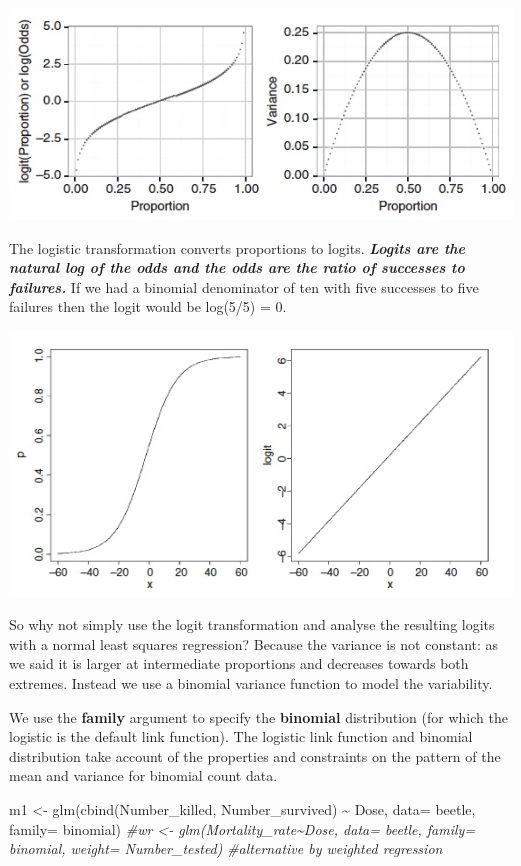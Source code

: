 \documentclass[
]{article}
\newenvironment{Shaded}{\begin{snugshade}}{\end{snugshade}}
\newcommand{\AttributeTok}[1]{\textcolor[rgb]{0.77,0.63,0.00}{#1}}
\newcommand{\CommentTok}[1]{\textcolor[rgb]{0.56,0.35,0.01}{\textit{#1}}}
\newcommand{\FunctionTok}[1]{\textcolor[rgb]{0.00,0.00,0.00}{#1}}
\newcommand{\NormalTok}[1]{#1}
\newcommand{\OtherTok}[1]{\textcolor[rgb]{0.56,0.35,0.01}{#1}}
\newcommand{\SpecialCharTok}[1]{\textcolor[rgb]{0.00,0.00,0.00}{#1}}
\begin{document}
\includegraphics{images/Box9.2.jpeg}

The logistic transformation converts proportions to logits.
\textbf{\emph{Logits are the natural log of the odds and the odds are
the ratio of successes to failures.}} If we had a binomial denominator
of ten with five successes to five failures then the logit would be
log(5/5) = 0.

\includegraphics{images/crawley_p_to_logit.jpeg}

So why not simply use the logit transformation and analyse the resulting
logits with a normal least squares regression? Because the variance is
not constant: as we said it is larger at intermediate proportions and
decreases towards both extremes. Instead we use a binomial variance
function to model the variability.

We use the \textbf{family} argument to specify the \textbf{binomial}
distribution (for which the logistic is the default link function). The
logistic link function and binomial distribution take account of the
properties and constraints on the pattern of the mean and variance for
binomial count data.

\begin{Shaded}
\begin{Highlighting}[]
\NormalTok{m1 }\OtherTok{\textless{}{-}} \FunctionTok{glm}\NormalTok{(}\FunctionTok{cbind}\NormalTok{(Number\_killed, Number\_survived) }\SpecialCharTok{\textasciitilde{}}\NormalTok{ Dose, }\AttributeTok{data=}\NormalTok{ beetle, }\AttributeTok{family=}\NormalTok{ binomial)}
\CommentTok{\#wr \textless{}{-} glm(Mortality\_rate\textasciitilde{}Dose, data= beetle, family= binomial, weight= Number\_tested)}
\CommentTok{\#alternative by weighted regression}
\end{Highlighting}
\end{Shaded}
\end{document}
